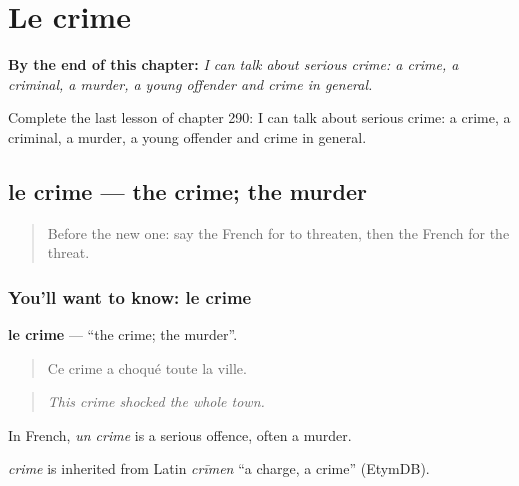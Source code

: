 
\chapter{Le crime}
\label{ch:fr-le-crime}

\begin{chapteropening}
\textbf{By the end of this chapter:} \emph{I can talk about serious crime: a crime, a criminal, a murder, a young offender and crime in general.}

Complete the last lesson of chapter 290: I can talk about serious crime: a crime, a criminal, a murder, a young offender and crime in general.
\end{chapteropening}

\section[le crime]{le crime — the crime; the murder}

\label{lesson:FR-C290-crime}



\begin{quote}
Before the new one: say the French for to threaten, then the French for the threat.
\end{quote}

\subsection*{You'll want to know: le crime}
\textbf{le crime} — \textquotedblleft{}the crime; the murder\textquotedblright{}.

\begin{quote}
Ce crime a choqué toute la ville.
\end{quote}

\begin{quote}
\emph{This crime shocked the whole town.}
\end{quote}

In French, \emph{un crime} is a serious offence, often a murder.

\begin{cousinweb}
\emph{crime} is inherited from Latin \emph{crīmen} \textquotedblleft{}a charge, a crime\textquotedblright{} (EtymDB).
\end{cousinweb}


